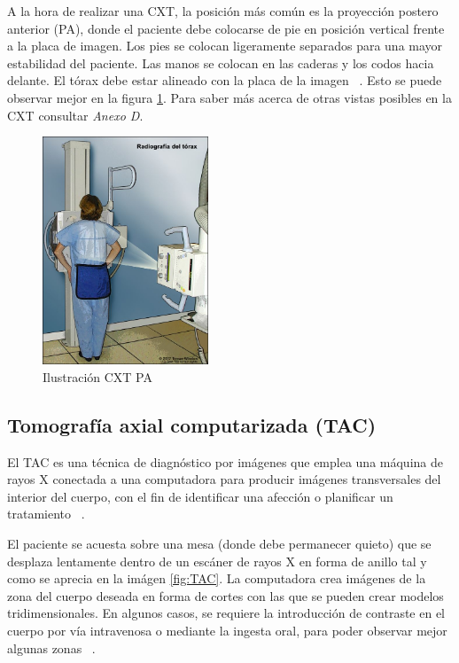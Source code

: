 A la hora de realizar una CXT, la posición más común es la proyección postero anterior (PA), donde el paciente debe colocarse de pie en posición vertical frente a la placa de imagen. Los pies se colocan ligeramente separados para una mayor estabilidad del paciente. Las manos se colocan en las caderas y los codos hacia delante. El tórax debe estar alineado con la placa de la imagen ~\cite{gelaw15}. Esto se puede observar mejor en la figura \ref{fig:radiografia torax}. Para saber más acerca de otras vistas posibles en la CXT consultar \textit{Anexo D}.

\begin{figure}[h]
    \centering
    \includegraphics[width=0.44\textwidth]{img/radiografia torax.jpg}
    \caption{Ilustración CXT PA ~\cite{NIH24}}
    \label{fig:radiografia torax}
\end{figure}
\FloatBarrier

\subsection{Tomografía axial computarizada (TAC)}

El TAC es una técnica de diagnóstico por imágenes que emplea una máquina de rayos X conectada a una computadora para producir imágenes transversales del interior del cuerpo, con el fin de identificar una afección o planificar un tratamiento ~\cite{NIHTAC24}. 

El paciente se acuesta sobre una mesa (donde debe permanecer quieto) que se desplaza lentamente dentro de un escáner de rayos X en forma de anillo tal y como se aprecia en la imágen \ref{fig:TAC}. La computadora crea imágenes de la zona del cuerpo deseada en forma de cortes con las que se pueden crear modelos tridimensionales. En algunos casos, se requiere la introducción de contraste en el cuerpo por vía intravenosa o mediante la ingesta oral, para poder observar mejor algunas zonas ~\cite{MedPlusTAC24}.


